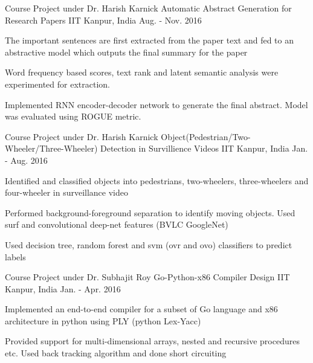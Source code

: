 \begin{cventries}
	
	\cventry
	{Course Project under Dr. Harish Karnick} %
	{Automatic Abstract Generation for Research Papers} %
	{IIT Kanpur, India} %
	{Aug. - Nov. 2016} %
	{
		\begin{cvitems} %
			\item {
				The important sentences are first extracted from the paper text and fed to an abstractive model which outputs the final summary for the paper
			}
			\item {
				Word frequency based scores, text rank and latent semantic analysis were experimented for extraction. 
			}
			\item {
				Implemented RNN encoder-decoder network to generate the final abstract. Model was evaluated using ROGUE metric.
			}  
		\end{cvitems}
	}
	
	\cventry
	{Course Project under Dr. Harish Karnick} %
	{Object(Pedestrian/Two-Wheeler/Three-Wheeler) Detection in Survillience Videos} %
	{IIT Kanpur, India} %
	{Jan. - Aug. 2016} %
	{
		\begin{cvitems} %
			\item {Identified and classified objects into pedestrians, two-wheelers, three-wheelers and four-wheeler in surveillance video}
			\item {Performed background-foreground separation to identify moving objects. Used surf and convolutional deep-net features (BVLC GoogleNet)}
			\item {Used decision tree, random forest and svm (ovr and ovo) classifiers to predict labels}
		\end{cvitems}
	}
	
	
	\cventry
	{Course Project under Dr. Subhajit Roy} %
	{Go-Python-x86 Compiler Design} %
	{IIT Kanpur, India} %
	{Jan. - Apr. 2016} %
	{
		\begin{cvitems} %
			\item Implemented an end-to-end compiler for a subset of Go language and x86 architecture in python using PLY (python Lex-Yacc)
			\item Provided support for multi-dimensional arrays, nested and recursive procedures etc. Used back tracking algorithm and done short circuiting
		\end{cvitems}
	}
	

\end{cventries}
